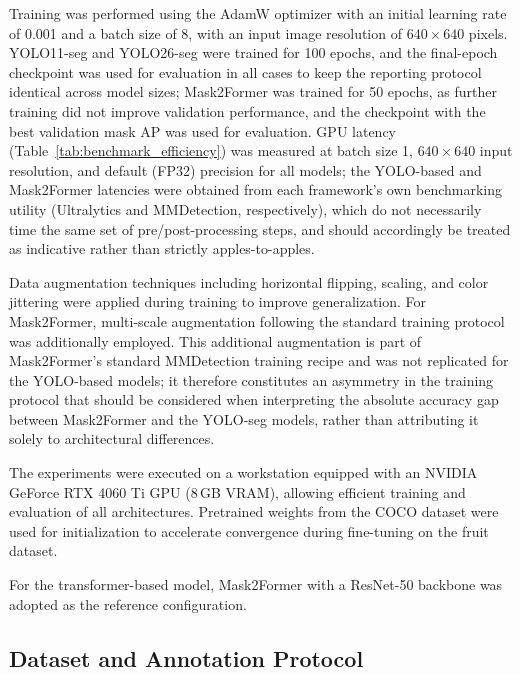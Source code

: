 \documentclass[runningheads]{llncs}
\begin{document}
Training was performed using the AdamW optimizer with an initial learning rate
of 0.001 and a batch size of 8, with an input image resolution of
$640 \times 640$ pixels. YOLO11-seg and YOLO26-seg were trained for 100
epochs, and the final-epoch checkpoint was used for evaluation in all cases
to keep the reporting protocol identical across model sizes; Mask2Former was
trained for 50 epochs, as further training did not improve validation
performance, and the checkpoint with the best validation mask AP was used
for evaluation. GPU latency (Table~\ref{tab:benchmark_efficiency})
was measured at batch size 1, $640\times640$ input resolution, and default
(FP32) precision for all models; the YOLO-based and Mask2Former latencies were
obtained from each framework's own benchmarking utility (Ultralytics and
MMDetection, respectively), which do not necessarily time the same set of
pre/post-processing steps, and should accordingly be treated as indicative
rather than strictly apples-to-apples.

Data augmentation techniques including horizontal flipping, scaling, and color
jittering were applied during training to improve generalization. For
Mask2Former, multi-scale augmentation following the standard training protocol
was additionally employed. This additional augmentation is part of
Mask2Former's standard MMDetection training recipe and was not replicated for
the YOLO-based models; it therefore constitutes an asymmetry in the training
protocol that should be considered when interpreting the absolute accuracy gap
between Mask2Former and the YOLO-seg models, rather than attributing it solely
to architectural differences.

The experiments were executed on a workstation equipped with an NVIDIA GeForce
RTX 4060 Ti GPU (8\,GB VRAM), allowing efficient training and evaluation of all
architectures. Pretrained weights from the COCO dataset \cite{lin2014coco} were used for
initialization to accelerate convergence during fine-tuning on the fruit
dataset.

For the transformer-based model, Mask2Former with a ResNet-50 backbone was
adopted as the reference configuration.


\subsection{Dataset and Annotation Protocol}
\end{document}
